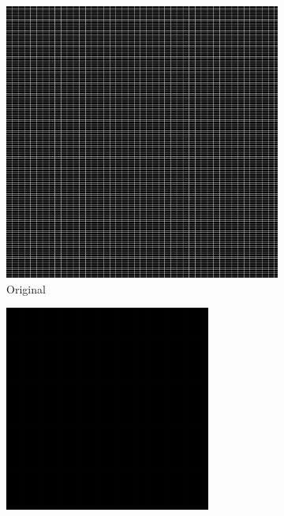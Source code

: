 \documentclass{article}
\begin{document}
\begin{figure}[ht]
  \centering
  \begin{subfigure}{0.23\textwidth}
    \centering
    \includegraphics[width=\textwidth]{pb/pb.png}
    \caption{Original}
  \end{subfigure}%
  \hfill
  \begin{subfigure}{0.23\textwidth}
    \centering
    \includegraphics[width=\textwidth]{pb/compressed.png}

\end{subfigure}
\end{figure}
\end{document}
